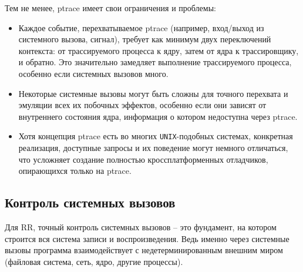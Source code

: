 Тем не менее, ptrace имеет свои ограничения и проблемы:

\begin{itemize}

  \item Каждое событие, перехватываемое ptrace (например, вход/выход из
  системного вызова, сигнал), требует как минимум двух переключений контекста:
  от трассируемого процесса к ядру, затем от ядра к трассировщику, и обратно.
  Это значительно замедляет выполнение трассируемого процесса, особенно если
  системных вызовов много.


  \item Некоторые системные вызовы могут быть сложны для точного перехвата и
  эмуляции всех их побочных эффектов, особенно если они зависят от внутреннего
  состояния ядра, информация о котором недоступна через ptrace.

  \item Хотя концепция ptrace есть во многих \texttt{UNIX}-подобных системах, конкретная
  реализация, доступные запросы и их поведение могут немного отличаться, что
  усложняет создание полностью кроссплатформенных отладчиков, опирающихся
  только на ptrace.

\end{itemize}

\subsection{Контроль системных вызовов}


Для RR, точный контроль системных вызовов – это фундамент,
на котором строится вся система записи и воспроизведения. Ведь именно через
системные вызовы программа взаимодействует с недетерминированным внешним миром
(файловая система, сеть, ядро, другие процессы).

